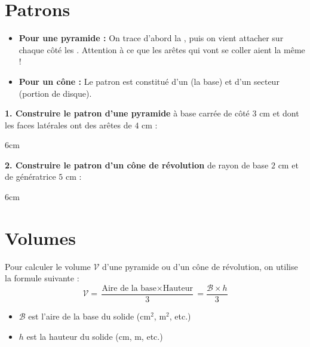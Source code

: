 \documentclass[a4paper]{book}
\begin{document}
\section{Patrons}
    
    \begin{methode}
        \begin{itemize}
            \item \textbf{Pour une pyramide :} On trace d'abord la \points[5], puis on vient attacher sur chaque côté les \points[10]. Attention à ce que les arêtes qui vont se coller aient la même \points[6] !
            \item \textbf{Pour un cône :} Le patron est constitué d'un \points[5] (la base) et d'un secteur \points[6] (portion de disque).
        \end{itemize}
    \end{methode}
    
    \begin{exemple}
        \textbf{1. Construire le patron d'une pyramide} à base carrée de côté $3\text{ cm}$ et dont les faces latérales ont des arêtes de $4\text{ cm}$ :
    \end{exemple}
    \begin{ZoneReponse}{6cm}
    \end{ZoneReponse}
    
    \begin{exemple}
        \textbf{2. Construire le patron d'un cône de révolution} de rayon de base $2\text{ cm}$ et de génératrice $5\text{ cm}$ :
    \end{exemple}
    \begin{ZoneReponse}{6cm}
    \end{ZoneReponse}

\section{Volumes}

    \begin{propriete}
        Pour calculer le volume $\mathcal{V}$ d'une pyramide ou d'un cône de révolution, on utilise la formule suivante :
        \[ \mathcal{V} = \frac{\text{Aire de la base} \times \text{Hauteur}}{3} = \frac{\mathcal{B} \times h}{3} \]
        \begin{itemize}
            \item $\mathcal{B}$ est l'aire de la base du solide ($\text{cm}^2$, $\text{m}^2$, etc.)
            \item $h$ est la hauteur du solide ($\text{cm}$, $\text{m}$, etc.)
        \end{itemize}
    \end{propriete}
    
\end{document}
